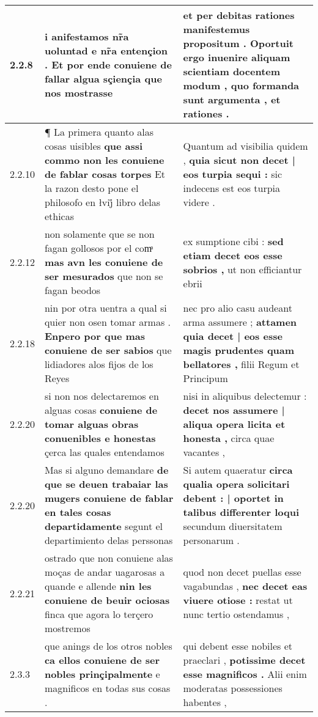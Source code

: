 \begin{tabular}{|p{1cm}|p{6.5cm}|p{6.5cm}|}
2.2.8 & i anifestamos nr̃a uoluntad e nr̃a entençion . \textbf{ Et por ende conuiene de fallar algua sçiençia } que nos mostrasse & et per debitas rationes manifestemus propositum . \textbf{ Oportuit ergo inuenire aliquam scientiam docentem modum , } quo formanda sunt argumenta , et rationes . \\\hline
2.2.10 & ¶ La primera quanto alas cosas uisibles \textbf{ que assi commo non les conuiene de fablar cosas torpes } Et la razon desto pone el philosofo en łvij̊ libro delas ethicas & Quantum ad visibilia quidem , \textbf{ quia sicut non decet | eos turpia sequi : } sic indecens est eos turpia videre . \\\hline
2.2.12 & non solamente que se non fagan gollosos por el comͣ \textbf{ mas avn les conuiene de ser mesurados } que non se fagan beodos & ex sumptione cibi : \textbf{ sed etiam decet eos esse sobrios , } ut non efficiantur ebrii \\\hline
2.2.18 & nin por otra uentra a qual si quier non osen tomar armas . \textbf{ Enpero por que mas conuiene de ser sabios } que lidiadores alos fijos de los Reyes & nec pro alio casu audeant arma assumere ; \textbf{ attamen quia decet | eos esse magis prudentes quam bellatores , } filii Regum et Principum \\\hline
2.2.20 & si non nos delectaremos en alguas cosas \textbf{ conuiene de tomar alguas obras conuenibles e honestas } çerca las quales entendamos & nisi in aliquibus delectemur : \textbf{ decet nos assumere | aliqua opera licita et honesta , } circa quae vacantes , \\\hline
2.2.20 & Mas si alguno demandare \textbf{ de que se deuen trabaiar las mugers conuiene de fablar en tales cosas departidamente } segunt el departimiento delas perssonas & Si autem quaeratur \textbf{ circa qualia opera solicitari debent : | oportet in talibus differenter loqui } secundum diuersitatem personarum . \\\hline
2.2.21 & ostrado que non conuiene alas moças de andar uagarosas a quande e allende \textbf{ nin les conuiene de beuir ociosas } finca que agora lo terçero mostremos & quod non decet puellas esse vagabundas , \textbf{ nec decet eas viuere otiose : } restat ut nunc tertio ostendamus , \\\hline
2.3.3 & que anings de los otros nobles \textbf{ ca ellos conuiene de ser nobles prinçipalmente } e magnificos en todas sus cosas . & qui debent esse nobiles et praeclari , \textbf{ potissime decet esse magnificos . } Alii enim moderatas possessiones habentes , \\\hline

\end{tabular}
